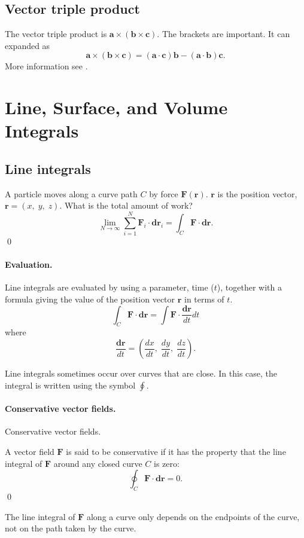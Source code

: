 \subsection{Vector triple product}
The vector triple product is 
$\bm{a} \times (\bm{b}\times \bm{c})$. 
The brackets are important. 
It can expanded as
\begin{equation}
    \bm{a} \times (\bm{b}\times \bm{c})
    = (\bm{a} \cdot \bm{c}) \bm{b}
    - (\bm{a} \cdot \bm{b}) \bm{c}.
\end{equation}
More information see \citealp[pg.~16]{matthews1998vector}.

\section{Line, Surface, and Volume Integrals}
\subsection{Line integrals}
\begin{example}
    A particle moves along a curve path $C$ by force $\bm{F}(\bm{r})$. 
    $\bm{r}$ is the position vector, $\bm{r} = (x,\;y,\;z)$. 
    What is the total amount of work?
    \begin{equation}
        \lim_{N\to \infty} \sum_{i=1}^N \bm{F}_i \cdot \bm{dr}_i
        = \int_C \bm{F} \cdot \bm{dr}.
    \end{equation}
    \qed
\end{example}
\paragraph{Evaluation.}
Line integrals are evaluated by using a parameter, time ($t$), together with a formula giving the value of the position vector $\bm{r}$ in terms of $t$.
\begin{equation}
    \int_C \bm{F} \cdot \bm{dr}
    = \int \bm{F} \cdot \frac{\bm{dr}}{dt} dt 
\end{equation}
where 
\begin{equation}
    \frac{\bm{dr}}{dt} 
    = \left( \frac{dx}{dt},\; \frac{dy}{dt},\; \frac{dz}{dt} \right).
\end{equation}

Line integrals sometimes occur over curves that are close. 
In this case, the integral is written using the symbol $\oint$. 

\paragraph{Conservative vector fields. }
\begin{definition}
    Conservative vector fields. 
    
    A vector field $\bm{F}$ is said to be conservative if it has the property that the line integral of $\bm{F}$ around any closed curve $C$ is zero:
    \begin{equation}
        \oint_C \bm{F} \cdot \bm{dr} = 0.
    \end{equation}
    \qed
\end{definition}
The line integral of $\bm{F}$ along a curve only depends on the endpoints of the curve, not on the path taken by the curve.

